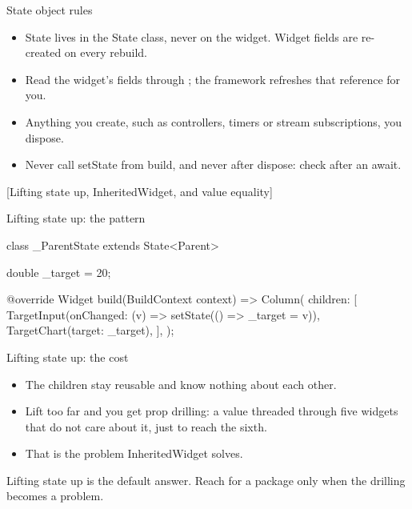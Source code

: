 \documentclass[10pt,aspectratio=169,t]{beamer}
\begin{document}
\begin{frame}[eyebrow=State]{State object rules}
  \vskip 3mm
  \begin{itemize}
    \item State lives in the State class, never on the widget. Widget fields are re-created on every rebuild.
    \item Read the widget's fields through ; the framework refreshes that reference for you.
    \item Anything you create, such as controllers, timers or stream subscriptions, you dispose.
    \item Never call setState from build, and never after dispose: check  after an await.
  \end{itemize}
\end{frame}

[Lifting state up, InheritedWidget, and value equality]

\begin{frame}[fragile,eyebrow=Sharing state]{Lifting state up: the pattern}
\begin{dart}
class _ParentState extends State<Parent> {
  double _target = 20;

  @override
  Widget build(BuildContext context) => Column(
    children: [
      TargetInput(onChanged: (v) => setState(() => _target = v)),
      TargetChart(target: _target),
    ],
  );
}
\end{dart}
\end{frame}

\begin{frame}[eyebrow=Sharing state]{Lifting state up: the cost}
  \vskip 3mm
  \begin{itemize}
    \item The children stay reusable and know nothing about each other.
    \item Lift too far and you get prop drilling: a value threaded through five widgets that do not care about it, just to reach the sixth.
    \item That is the problem InheritedWidget solves.
  \end{itemize}
  \vskip 4mm
  \begin{takeaway}{Lifting state up is the default answer.}
    Reach for a package only when the drilling becomes a problem.
  \end{takeaway}
\end{frame}
\end{document}
